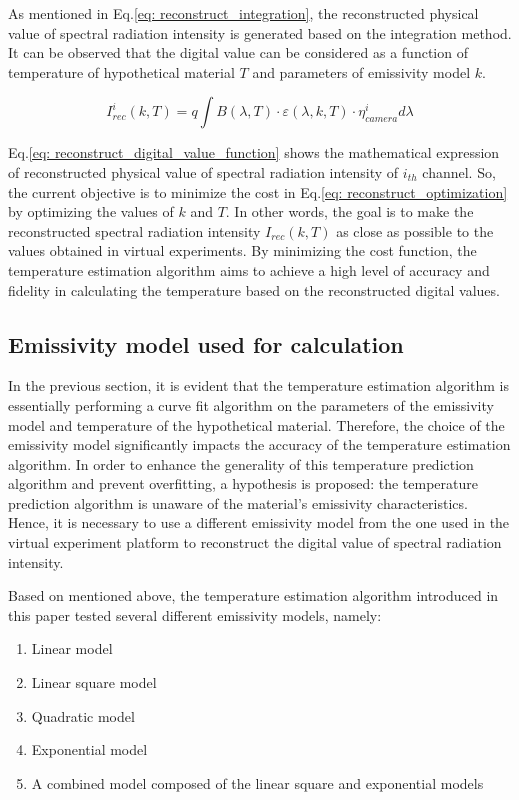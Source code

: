 As mentioned in Eq.\ref{eq: reconstruct_integration}, the reconstructed physical value 
of spectral radiation intensity is generated based on the integration method. It can 
be observed that the digital value can be considered as a function of temperature of 
hypothetical material $T$ and parameters of emissivity model $k$.


\begin{equation}
  \label{eq: reconstruct_digital_value_function}
  I_{rec}^i (k, T) = q \int B(\lambda, T) \cdot \varepsilon(\lambda, k, T) 
  \cdot \eta_{camera}^i d\lambda
\end{equation}


Eq.\ref{eq: reconstruct_digital_value_function} shows the mathematical expression 
of reconstructed physical value of spectral radiation intensity of $i_{th}$ channel.
So, the current objective is to minimize the cost in Eq.\ref{eq: reconstruct_optimization} 
by optimizing the values of $k$ and $T$. In other words, the goal is to make the 
reconstructed spectral radiation intensity $I_{rec}(k, T)$ as close as possible 
to the values obtained in virtual experiments. By minimizing the cost function, 
the temperature estimation algorithm aims to achieve a high level of accuracy 
and fidelity in calculating the temperature based on the reconstructed 
digital values.


\subsection{Emissivity model used for calculation}
In the previous section, it is evident that the temperature estimation 
algorithm is essentially performing a curve fit algorithm on the parameters of the 
emissivity model and temperature of the hypothetical material. 
Therefore, the choice of the emissivity model significantly impacts 
the accuracy of the temperature estimation algorithm. In order to 
enhance the generality of this temperature prediction algorithm and 
prevent overfitting, a hypothesis is proposed: the temperature 
prediction algorithm is unaware of the material's emissivity 
characteristics. Hence, it is necessary to use a different 
emissivity model from the one used in the virtual experiment 
platform to reconstruct the digital value of spectral radiation 
intensity.


Based on mentioned above, the temperature estimation algorithm 
introduced in this paper tested several different emissivity 
models, namely:


\begin{enumerate}
  \item Linear model
  \item Linear square model
  \item Quadratic model
  \item Exponential model
  \item A combined model composed of the linear square and exponential models
\end{enumerate}


